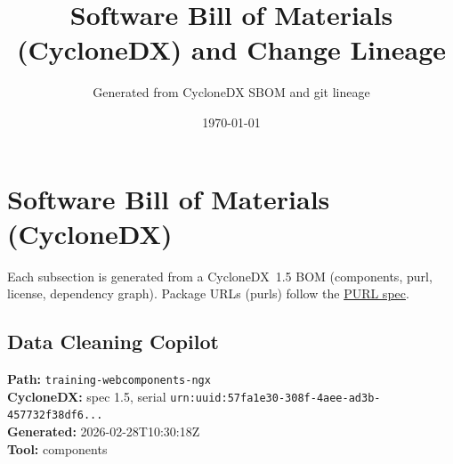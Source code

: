 \documentclass[11pt,a4paper]{article}
\title{\textbf{Software Bill of Materials (CycloneDX) and Change Lineage}}
\author{Generated from CycloneDX SBOM and git lineage}
\date{\today}
\begin{document}
\maketitle
\tableofcontents
\newpage
\section{Software Bill of Materials (CycloneDX)}
Each subsection is generated from a CycloneDX~1.5 BOM (components, purl, license, dependency graph). Package URLs (purls) follow the \href{https://github.com/package-url/purl-spec}{PURL spec}.

\subsection{Data Cleaning Copilot}
\textbf{Path:} \texttt{training-webcomponents-ngx}
\\ \textbf{CycloneDX:} spec 1.5, serial \texttt{urn:uuid:57fa1e30-308f-4aee-ad3b-457732f38df6...}
\\ \textbf{Generated:} 2026-02-28T10:30:18Z
\\ \textbf{Tool:} components
\end{document}
